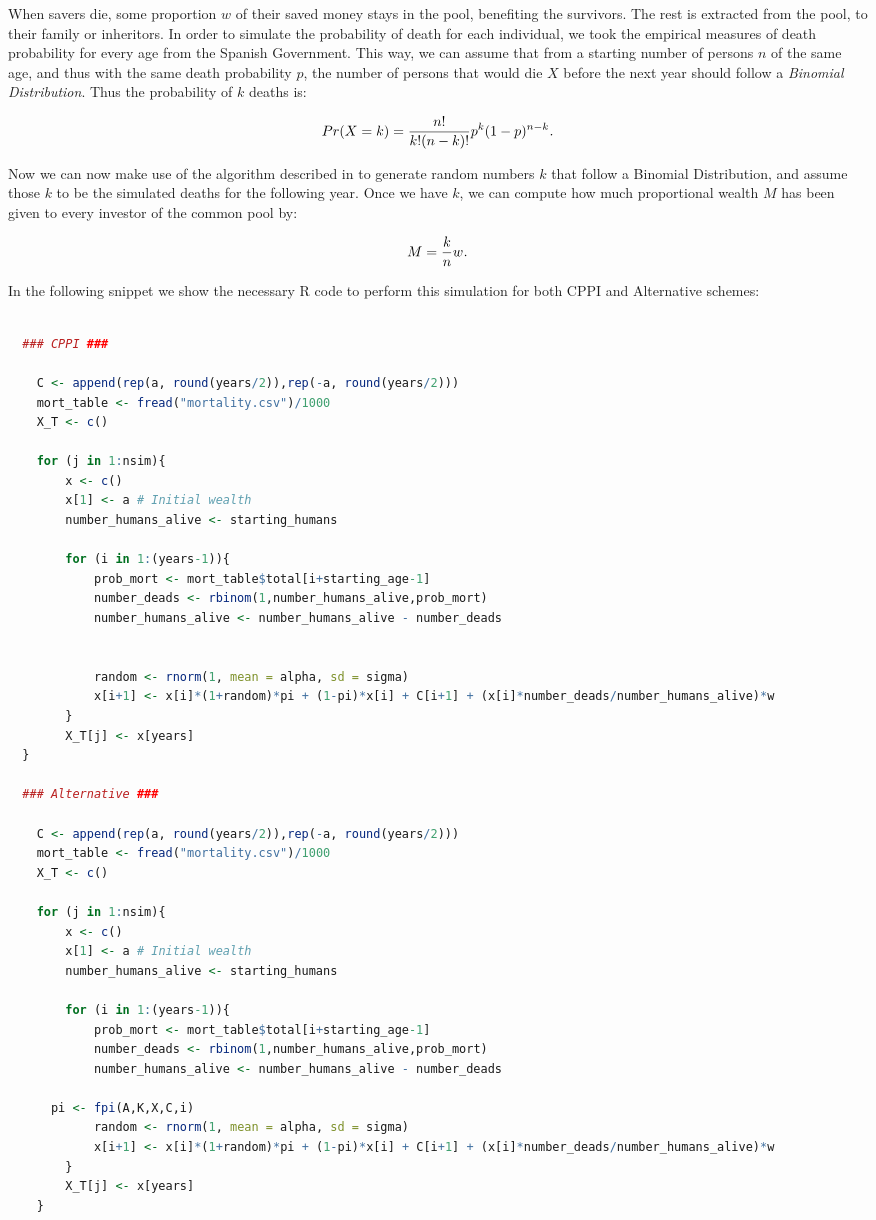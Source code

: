 When savers die, some proportion $w$ of their saved money stays in the pool, benefiting the survivors. The rest is extracted from the pool, to their family or inheritors. In order to simulate the probability of death for each individual, we took the empirical measures of death probability for every age from the Spanish Government. This way, we can assume that from a starting number of persons $n$ of the same age, and thus with the same death probability $p$, the number of persons that would die $X$ before the next year should follow a \emph{Binomial Distribution}. Thus the probability of $k$ deaths is:

\begin{align}
  Pr(X = k) = \frac{n!}{k!(n-k)!} p^k (1-p)^{n-k} \emph{.}
\end{align}

Now we can now make use of the algorithm described in \cite{a:schmeiser-binomial} to generate random numbers $k$ that follow a Binomial Distribution, and assume those $k$ to be the simulated deaths for the following year. Once we have $k$, we can compute how much proportional wealth $M$ has been given to every investor of the common pool by:

\begin{align}
  M = \frac{k}{n}w \emph{.}
\end{align}

In the following snippet we show the necessary R code to perform this simulation for both CPPI and Alternative schemes:

\begin{lstlisting}[language = R]

  ### CPPI ### 

	C <- append(rep(a, round(years/2)),rep(-a, round(years/2)))
	mort_table <- fread("mortality.csv")/1000
	X_T <- c()

	for (j in 1:nsim){
		x <- c()
		x[1] <- a # Initial wealth
		number_humans_alive <- starting_humans

		for (i in 1:(years-1)){
			prob_mort <- mort_table$total[i+starting_age-1]
			number_deads <- rbinom(1,number_humans_alive,prob_mort)
			number_humans_alive <- number_humans_alive - number_deads


			random <- rnorm(1, mean = alpha, sd = sigma)
			x[i+1] <- x[i]*(1+random)*pi + (1-pi)*x[i] + C[i+1] + (x[i]*number_deads/number_humans_alive)*w
		}
		X_T[j] <- x[years]
  }
  
  ### Alternative ### 
  
	C <- append(rep(a, round(years/2)),rep(-a, round(years/2)))
	mort_table <- fread("mortality.csv")/1000
	X_T <- c()

	for (j in 1:nsim){
		x <- c()
		x[1] <- a # Initial wealth
		number_humans_alive <- starting_humans

		for (i in 1:(years-1)){
			prob_mort <- mort_table$total[i+starting_age-1]
			number_deads <- rbinom(1,number_humans_alive,prob_mort)
			number_humans_alive <- number_humans_alive - number_deads

      pi <- fpi(A,K,X,C,i)
			random <- rnorm(1, mean = alpha, sd = sigma)
			x[i+1] <- x[i]*(1+random)*pi + (1-pi)*x[i] + C[i+1] + (x[i]*number_deads/number_humans_alive)*w
		}
		X_T[j] <- x[years]
	}
\end{lstlisting}